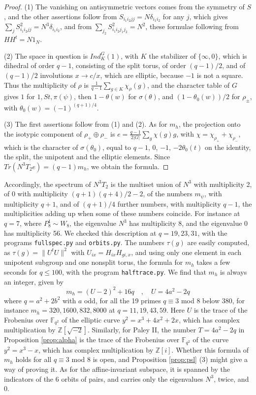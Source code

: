 \documentclass[11pt]{amsart}
\begin{document}
\begin{proof}
(1) The vanishing on antisymmetric vectors comes from the symmetry of $S$, and the other assertions follow from $S_{i_1i_2jj}=N\delta_{i_1i_2}$ for any $j$, which gives $\sum_jS_{i_1i_2jj}^2=N^3\delta_{i_1i_2}$, and from $\sum_{j_2}S_{i_1i_2j_1j_2}^2=N^2$, these formulae following from $HH^t=N1_N$.

(2) The space in question is $Ind_K^G(1)$, with $K$ the stabilizer of $\{\infty,0\}$, which is dihedral of order $q-1$, consisting of the split torus, of order $(q-1)/2$, and of $(q-1)/2$ involutions $x\to c/x$, which are elliptic, because $-1$ is not a square. Thus the multiplicity of $\rho$ is $\frac{1}{q-1}\sum_{g\in K}\chi_\rho(g)$, and the character table of $G$ gives $1$ for $1,St,\pi(\psi)$, then $1-\theta(w)$ for $\sigma(\theta)$, and $(1-\theta_0(w))/2$ for $\rho_\pm$, with $\theta_0(w)=(-1)^{(q+1)/4}$.

(3) The first assertions follow from (1) and (2). As for $m_h$, the projection onto the isotypic component of $\rho_+\oplus\rho_-$ is $e=\frac{q-1}{2|G|}\sum_g\chi(g)g$, with $\chi=\chi_{\rho_+}+\chi_{\rho_-}$, which is the character of $\sigma(\theta_0)$, equal to $q-1$, $0$, $-1$, $-2\theta_0(t)$ on the identity, the split, the unipotent and the elliptic elements. Since $Tr(N^3T_2e)=(q-1)m_h$, we obtain the formula.
\end{proof}

Accordingly, the spectrum of $N^3T_2$ is the multiset union of $N^3$ with multiplicity 2, of $0$ with multiplicity $(q+1)(q+4)/2-2$, of the numbers $m_\psi$, with multiplicity $q+1$, and of $(q+1)/4$ further numbers, with multiplicity $q-1$, the multiplicities adding up when some of these numbers coincide. For instance at $q=7$, where $P_8^1\sim W_8$, the eigenvalue $N^3$ has multiplicity 8, and the eigenvalue 0 has multiplicity 56. We checked this description at $q=19,23,31$, with the programs \texttt{fullspec.py} and \texttt{orbits.py}. The numbers $\tau(g)$ are easily computed, as $\tau(g)=\|U^tU\|^2$ with $U_{ix}=H_{ix}H_{gi,x}$, and using only one element in each unipotent subgroup and one nonsplit torus, the formula for $m_h$ takes a few seconds for $q\leq100$, with the program \texttt{halftrace.py}. We find that $m_h$ is always an integer, given by
$$m_h=(U-2)^2+16q\quad,\quad U=4a^2-2q$$
where $q=a^2+2b^2$ with $a$ odd, for all the 19 primes $q\equiv3$ mod 8 below 380, for instance $m_h=320,1600,832,8000$ at $q=11,19,43,59$. Here $U$ is the trace of the Frobenius over $\mathbb F_{q^2}$ of the elliptic curve $y^2=x^3+4x^2+2x$, which has complex multiplication by $\mathbb Z[\sqrt{-2}]$. Similarly, for Paley II, the number $T=4a^2-2q$ in Proposition \ref{prop:alpha} is the trace of the Frobenius over $\mathbb F_{q^2}$ of the curve $y^2=x^3-x$, which has complex multiplication by $\mathbb Z[i]$. Whether this formula of $m_h$ holds for all $q\equiv3$ mod 8 is open, and Proposition \ref{prop:psl} (3) might give a way of proving it. As for the affine-invariant subspace, it is spanned by the indicators of the 6 orbits of pairs, and carries only the eigenvalues $N^3$, twice, and $0$.
\end{document}
